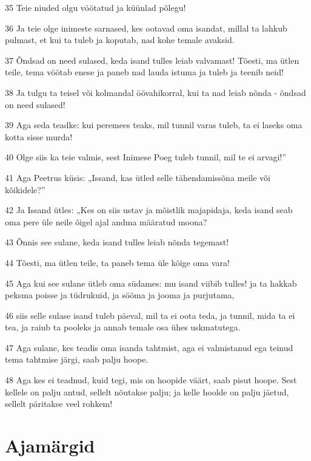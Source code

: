 \par 35 Teie niuded olgu vöötatud ja küünlad põlegu!
\par 36 Ja teie olge inimeste sarnased, kes ootavad oma isandat, millal ta lahkub pulmast, et kui ta tuleb ja koputab, nad kohe temale avaksid.
\par 37 Õndsad on need sulased, keda isand tulles leiab valvamast! Tõesti, ma ütlen teile, tema vöötab enese ja paneb nad lauda istuma ja tuleb ja teenib neid!
\par 38 Ja tulgu ta teisel või kolmandal öövahikorral, kui ta nad leiab nõnda - õndsad on need sulased!
\par 39 Aga seda teadke: kui peremees teaks, mil tunnil varas tuleb, ta ei laseks oma kotta sisse murda!
\par 40 Olge siis ka teie valmis, sest Inimese Poeg tuleb tunnil, mil te ei arvagi!”
\par 41 Aga Peetrus küsis: „Issand, kas ütled selle tähendamissõna meile või kõikidele?”
\par 42 Ja Issand ütles: „Kes on siis ustav ja mõistlik majapidaja, keda isand seab oma pere üle neile õigel ajal andma määratud moona?
\par 43 Õnnis see sulane, keda isand tulles leiab nõnda tegemast!
\par 44 Tõesti, ma ütlen teile, ta paneb tema üle kõige oma vara!
\par 45 Aga kui see sulane ütleb oma südames: mu isand viibib tulles! ja ta hakkab peksma poisse ja tüdrukuid, ja sööma ja jooma ja purjutama,
\par 46 siis selle sulase isand tuleb päeval, mil ta ei oota teda, ja tunnil, mida ta ei tea, ja raiub ta pooleks ja annab temale osa ühes uskmatutega.
\par 47 Aga sulane, kes teadis oma isanda tahtmist, aga ei valmistanud ega teinud tema tahtmise järgi, saab palju hoope.
\par 48 Aga kes ei teadnud, kuid tegi, mis on hoopide väärt, saab pisut hoope. Sest kellele on palju antud, sellelt nõutakse palju; ja kelle hoolde on palju jäetud, sellelt päritakse veel rohkem!

\section*{Ajamärgid}

